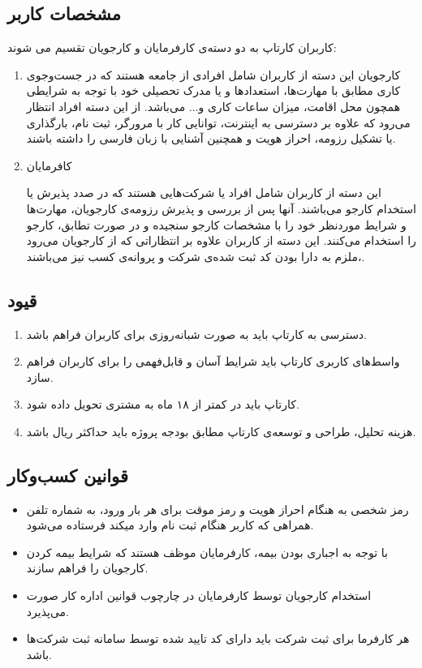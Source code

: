 \subsection{مشخصات کاربر}
کاربران کارتاپ به دو دسته‌ی کارفرمایان و کارجویان تقسیم می شوند:

\begin{enumerate}
	\item
	کارجویان
	این دسته از کاربران شامل افرادی از جامعه هستند که در جست‌وجوی کاری مطابق با مهارت‌ها، استعدادها و یا مدرک تحصیلی خود با توجه به شرایطی همچون محل اقامت، میزان ساعات کاری و... می‌باشد. از این دسته افراد انتظار می‌رود که علاوه بر دسترسی به اینترنت، توانایی کار با مرورگر، ثبت نام، بارگذاری یا تشکیل رزومه، احراز هویت و همچنین آشنایی با زبان فارسی را داشته باشند.
	\item
	کافرمایان
	
	این دسته از کاربران شامل افراد یا شرکت‌هایی هستند که در صدد پذیرش یا استخدام کارجو می‌باشند. آنها پس از بررسی و پذیرش رزومه‌ی کارجویان، مهارت‌ها و شرایط موردنظر خود را با مشخصات کارجو سنجیده و در صورت تطابق، کارجو را استخدام می‌کنند. این دسته از کاربران علاوه بر انتظاراتی که از کارجویان می‌رود ،ملزم به دارا بودن کد ثبت شده‌ی شرکت و پروانه‌ی کسب نیز می‌باشند.
\end{enumerate}

\subsection{قیود}
\begin{enumerate}
	\item
	دسترسی به کارتاپ باید به صورت شبانه‌روزی برای کاربران فراهم باشد.
	\item
	واسط‌های کاربری کارتاپ باید شرایط آسان و قابل‌فهمی را برای کاربران فراهم سازد.
	\item
	کارتاپ باید در کمتر از ۱۸ ماه به مشتری تحویل داده شود.
	\item
	هزینه تحلیل، طراحی و توسعه‌ی کارتاپ مطابق بودجه پروژه باید حداکثر  ریال باشد.
\end{enumerate}
\subsection{قوانین کسب‌و‌کار}
\begin{itemize}
	\item
	رمز شخصی به هنگام احراز هویت و رمز موقت برای هر بار ورود، به شماره تلفن همراهی که کاربر هنگام ثبت نام وارد میکند فرستاده می‌شود.
	\item
	با توجه به اجباری بودن بیمه، کارفرمایان موظف هستند که شرایط بیمه کردن کارجویان را فراهم سازند.
	\item
	استخدام کارجویان توسط کارفرمایان در چارچوب قوانین اداره کار صورت می‌پذیرد.
	\item
	هر کارفرما برای ثبت شرکت باید دارای کد تایید شده توسط سامانه ثبت شرکت‌ها باشد.
	
\end{itemize}
